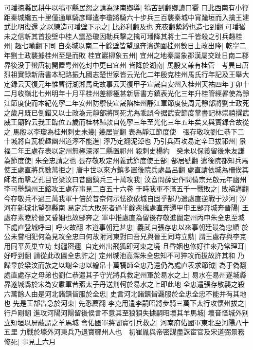 可璠掠縣民耕牛以犒軍縣民怨之請為湖南鄉導|{
	犒苦到翻鄉讀曰嚮}
曰此西南有小徑距秦城纔五十里僅通單騎彦暉遣李瓊將騎六十步兵三百襲秦城中宵踰垣而入擒王建武比明復還之以練造可璠壁下示之|{
	比必利翻及也充夜翻縶縛也造七到翻}
可璠猶未之信斬其首投壁中桂人震恐瓊因勒兵擊之擒可璠降其將士二千皆殺之引兵趣桂州|{
	趣七喻翻下同}
自秦城以南二十餘壁皆望風奔潰遂圍桂州數日士政出降|{
	乾寜二年劉士政襲據桂州至是而敗}
桂宜巖柳象五州|{
	宜州之地秦屬象郡漢屬交趾日南二郡界後没于蠻唐初開置粤州乾封中更曰宜州}
皆降於湖南|{
	馬殷又兼有桂管　考異曰唐烈祖實録新唐書本紀路振九國志楚世家皆云光化二年殷克桂州馬氏行年記及王舉大定録云天復元年惟曹衍湖湘馬氐故事云天復甲子宣晟自安州入桂州天祐四年丁卯十二月收嶺北七州明年十月平桂州差繆極甚新唐書方鎮表光化三年升桂管經畧使為靜江節度使而本紀乾寧二年安州防禦使宣晟陷桂州靜江軍節度使周元靜部將劉士政死之歲月既已倒錯又以士政為元靜部將同死尤為乖誤今据武安節度掌書記林崇禧撰武威王廟碑云我王臨位五歲而桂林歸款自乾寧三年至光化三年五年矣又與實録合故從之}
馬殷以李瓊為桂州刺史未幾|{
	幾居豈翻}
表為靜江節度使　張存敬攻劉仁恭下二十城將自瓦橋趣幽州道濘不能進|{
	濘乃定翻泥淖也}
乃引兵西攻易定辛巳拔祁州|{
	景福二年王處存表以定州無極深澤二縣置祁州}
殺刺史楊約　癸未以保義留後朱友謙為節度使|{
	朱全忠請之也}
張存敬攻定州義武節度使王郜|{
	郜居號翻}
遣後院都知兵馬使王處直將兵數萬拒之|{
	唐中世以來方鎮多置後院兵處昌呂翻}
處直請依城為柵俟其師老而擊之孔目官梁汶曰昔幽鎮兵三十萬攻我|{
	汶音問薛史作問僖宗光啟元年幽州李可舉鎮州王鎔攻王處存事見二百五十六卷}
于時我軍不滿五千一戰敗之|{
	敗補邁翻}
今存敬兵不過三萬我軍十倍於昔奈何示怯欲依城自固乎郜乃遣處直逆戰于沙河|{
	沙河在新城北望都縣南}
易定兵大敗死者過半餘衆擁處直奔還甲申王郜弃城奔晉陽|{
	王處存素睦於晉又昏姻也故郜奔之}
軍中推處直為留後存敬進圍定州丙申朱全忠至城下處直登城呼曰|{
	呼火故翻}
本道事朝廷甚忠|{
	義武自張存忠以來事朝廷最為忠順}
於公未嘗相犯何為見攻全忠曰何故附河東對曰吾兄與晉王同時立勲|{
	謂王處存與李克用同平黄巢立功}
封疆密邇|{
	自定州出飛狐即河東之境}
且昏姻也修好往來乃常理耳|{
	好呼到翻}
請從此改圖全忠許之|{
	定州城池高深朱全忠知不可猝攻而拔故許其和}
乃歸辠於梁汶而族之以謝全忠以繒帛十萬犒師全忠乃還仍為處直表求節钺|{
	為于偽翻}
處直處存之母弟也劉仁恭遣其子守光將兵救定州軍於易水之上|{
	易水在易州遂城縣界遂城縣於宋為安肅軍昔燕太子丹送荆軻於易水之上即此地}
全忠遣張存敬襲之殺六萬餘人由是河北諸鎮皆服於全忠|{
	史言河北諸鎮皆覊服於全忠全忠不能并有其地也}
先是王郜告急於河東|{
	先悉薦翻}
李克用遣李嗣昭將步騎三萬下太行攻懷州拔之|{
	行戶剛翻}
進攻河陽河陽留後侯言不意其至狼狽失據嗣昭壞其羊馬城|{
	壞音怪城外别立短垣以屏蔽謂之羊馬城}
會佑國軍將閻寶引兵救之|{
	河南府佑國軍東北至河陽八十五里}
力戰於壕外河東兵乃退寶鄆州人也　初崔胤與帝密謀盡誅宦官及宋道弼景務修死|{
	事見上六月}
